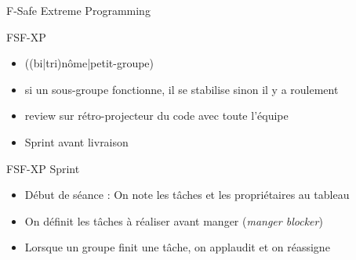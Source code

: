 {
%
\begin{frame}{F-Safe Extreme Programming}
  \begin{exampleblock}{FSF-XP}
    \begin{itemize}
    \item ((bi|tri)nôme|petit-groupe)
    \item si un sous-groupe fonctionne, il se stabilise sinon il y a roulement
    \item review sur rétro-projecteur du code avec toute l'équipe
    \item Sprint avant livraison
    \end{itemize}
  \end{exampleblock}
\end{frame}
}

\begin{frame}{FSF-XP Sprint}
  \begin{itemize}
  \item Début de séance : On note les tâches et les propriétaires au tableau
  \item On définit les tâches à réaliser avant manger (\emph{manger blocker})
  \item Lorsque un groupe finit une tâche, on applaudit et on réassigne
  \end{itemize}
\end{frame}


